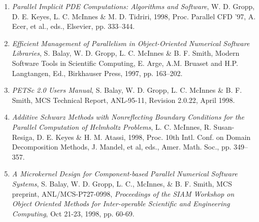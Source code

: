 \itemskip
{}
\begin{enumerate}
\item
{\em Parallel Implicit PDE Computations: Algorithms and Software},
W. D. Gropp, D. E. Keyes, L. C. McInnes \& M. D. Tidriri, 1998,
Proc. Parallel CFD '97, A. Ecer, et al., eds., 
Elsevier, pp. 333--344. 
\item
{\it Efficient Management of Parallelism in Object-Oriented Numerical
Software Libraries}, S. Balay, W. D. Gropp, L. C. McInnes \& B. F. Smith, 
Modern Software Tools in Scientific Computing, E. Arge, 
A.M. Bruaset and H.P. Langtangen, Ed., Birkhauser Press, 1997, pp. 163--202. 
\item
{\it PETSc 2.0 Users Manual}, S. Balay, W. D. Gropp, L. C. McInnes \& B. F. Smith,
MCS Technical Report, ANL-95-11, Revision 2.0.22, April 1998.
\item
{\em Additive Schwarz Methods with Nonreflecting Boundary
Conditions for the Parallel Computation of Helmholtz Problems},
L. C. McInnes, R. Susan-Resiga, D. E. Keyes \& H. M. Atassi, 
1998, Proc. 10th Intl. Conf. on Domain Decomposition
Methods, J. Mandel, et al, eds., Amer. Math. Soc., pp. 349--357. 
\newpage

\item
{\it A Microkernel Design for Component-based Parallel Numerical
Software Systems}, S. Balay, W. D. Gropp, L. C., McInnes, \& B. F. Smith, MCS preprint,
ANL/MCS-P727-0998, {\it Proceedings of the SIAM Workshop on
Object Oriented Methods for Inter-operable Scientific and Engineering
Computing}, Oct 21-23, 1998, pp. 60-69.

\end{enumerate}


